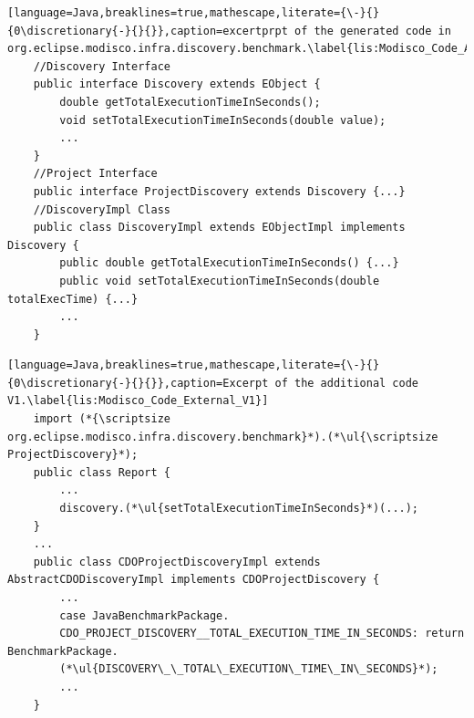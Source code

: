 \begin{lstlisting}[language=Java,breaklines=true,mathescape,literate={\-}{}{0\discretionary{-}{}{}},caption=excertprpt of the generated code in org.eclipse.modisco.infra.discovery.benchmark.\label{lis:Modisco_Code_API_V1}]
	//Discovery Interface
	public interface Discovery extends EObject {
		double getTotalExecutionTimeInSeconds();
		void setTotalExecutionTimeInSeconds(double value);
		...
	}
	//Project Interface
	public interface ProjectDiscovery extends Discovery {...}
	//DiscoveryImpl Class
	public class DiscoveryImpl extends EObjectImpl implements Discovery {
		public double getTotalExecutionTimeInSeconds() {...}
		public void setTotalExecutionTimeInSeconds(double totalExecTime) {...}
		...
	}
\end{lstlisting}
\begin{lstlisting}[language=Java,breaklines=true,mathescape,literate={\-}{}{0\discretionary{-}{}{}},caption=Excerpt of the additional code V1.\label{lis:Modisco_Code_External_V1}]
	import (*{\scriptsize org.eclipse.modisco.infra.discovery.benchmark}*).(*\ul{\scriptsize ProjectDiscovery}*);
	public class Report {
		...
		discovery.(*\ul{setTotalExecutionTimeInSeconds}*)(...);
	}
	...
	public class CDOProjectDiscoveryImpl extends AbstractCDODiscoveryImpl implements CDOProjectDiscovery {
		...
		case JavaBenchmarkPackage.
		CDO_PROJECT_DISCOVERY__TOTAL_EXECUTION_TIME_IN_SECONDS: return BenchmarkPackage.
		(*\ul{DISCOVERY\_\_TOTAL\_EXECUTION\_TIME\_IN\_SECONDS}*);
		...
	}
	
	
\end{lstlisting}

